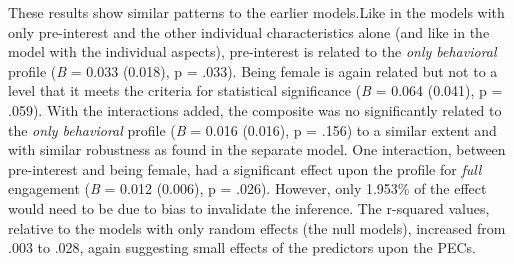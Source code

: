 \documentclass[]{msu-thesis}
\theoremstyle{definition}
\theoremstyle{definition}
\theoremstyle{definition}
\theoremstyle{remark}
\begin{document}
These results show similar patterns to the earlier models.Like in the
models with only pre-interest and the other individual characteristics
alone (and like in the model with the individual aspects), pre-interest
is related to the \emph{only behavioral} profile (\emph{B} = 0.033
(0.018), p = .033). Being female is again related but not to a level
that it meets the criteria for statistical significance (\emph{B} =
0.064 (0.041), p = .059). With the interactions added, the composite was
no significantly related to the \emph{only behavioral} profile (\emph{B}
= 0.016 (0.016), p = .156) to a similar extent and with similar
robustness as found in the separate model. One interaction, between
pre-interest and being female, had a significant effect upon the profile
for \emph{full} engagement (\emph{B} = 0.012 (0.006), p = .026).
However, only 1.953\% of the effect would need to be due to bias to
invalidate the inference. The r-squared values, relative to the models
with only random effects (the null models), increased from .003 to .028,
again suggesting small effects of the predictors upon the PECs.
\end{document}

